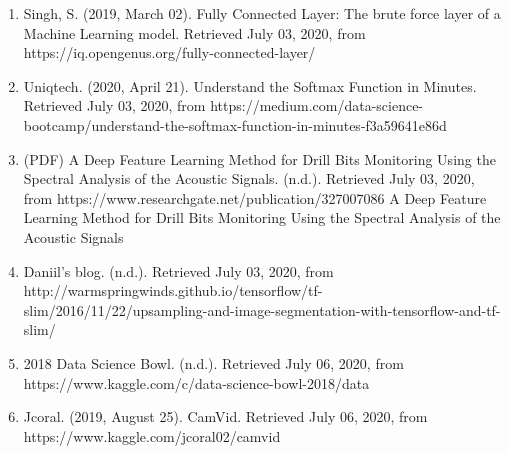 \documentclass{IEEEtran}
\begin{document}
\begin{enumerate}
\item Singh, S. (2019, March 02). Fully Connected Layer: The brute force layer of a Machine Learning model. Retrieved July 03, 2020, from https://iq.opengenus.org/fully-connected-layer/

\item Uniqtech. (2020, April 21). Understand the Softmax Function in Minutes. Retrieved July 03, 2020, from https://medium.com/data-science-bootcamp/understand-the-softmax-function-in-minutes-f3a59641e86d

\item (PDF) A Deep Feature Learning Method for Drill Bits Monitoring Using the Spectral Analysis of the Acoustic Signals. (n.d.). Retrieved July 03, 2020, from https://www.researchgate.net/publication/327007086 A Deep Feature Learning Method for Drill Bits Monitoring Using the Spectral Analysis of the Acoustic Signals

\item Daniil's blog. (n.d.). Retrieved July 03, 2020, from http://warmspringwinds.github.io/tensorflow/tf-slim/2016/11/22/upsampling-and-image-segmentation-with-tensorflow-and-tf-slim/

\item 2018 Data Science Bowl. (n.d.). Retrieved July 06, 2020, from https://www.kaggle.com/c/data-science-bowl-2018/data

\item Jcoral. (2019, August 25). CamVid. Retrieved July 06, 2020, from https://www.kaggle.com/jcoral02/camvid
\end{enumerate}
\end{document}
